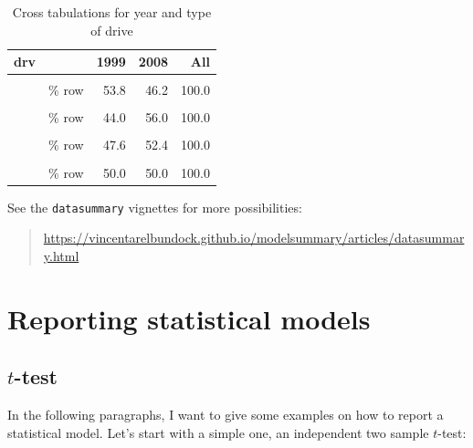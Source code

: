 \documentclass[
  11pt,
  a4paper,
  twoside]{scrbook}
\begin{document}
\linespread{1}

\begin{table}[H]

\caption{\label{tab:skim-df1-cat}Cross tabulations for year and type of drive}
\centering
\begin{tabular}[t]{llrrr}
\toprule
drv &   & 1999 & 2008 & All\\
\midrule
\cellcolor{gray!6}{Front wheel drive} & \cellcolor{gray!6}{N} & \cellcolor{gray!6}{57} & \cellcolor{gray!6}{49} & \cellcolor{gray!6}{106}\\
 & \% row & \num{53.8} & \num{46.2} & \num{100.0}\\
\cellcolor{gray!6}{Rear wheel drive} & \cellcolor{gray!6}{N} & \cellcolor{gray!6}{11} & \cellcolor{gray!6}{14} & \cellcolor{gray!6}{25}\\
 & \% row & \num{44.0} & \num{56.0} & \num{100.0}\\
\cellcolor{gray!6}{4 wheel drive} & \cellcolor{gray!6}{N} & \cellcolor{gray!6}{49} & \cellcolor{gray!6}{54} & \cellcolor{gray!6}{103}\\
 & \% row & \num{47.6} & \num{52.4} & \num{100.0}\\
\cellcolor{gray!6}{All} & \cellcolor{gray!6}{N} & \cellcolor{gray!6}{117} & \cellcolor{gray!6}{117} & \cellcolor{gray!6}{234}\\
 & \% row & \num{50.0} & \num{50.0} & \num{100.0}\\
\bottomrule
\end{tabular}
\end{table}

See the \texttt{datasummary} vignettes for more possibilities:

\begin{quote}
\url{https://vincentarelbundock.github.io/modelsummary/articles/datasummary.html}
\end{quote}

\hypertarget{reporting-statistical-models}{%
\section{Reporting statistical models}\label{reporting-statistical-models}}

\hypertarget{t-test}{%
\subsection{\texorpdfstring{\(t\)-test}{t-test}}\label{t-test}}

In the following paragraphs, I want to give some examples on how to report a statistical model. Let's start with a simple one, an independent two sample \(t\)-test:
\end{document}
